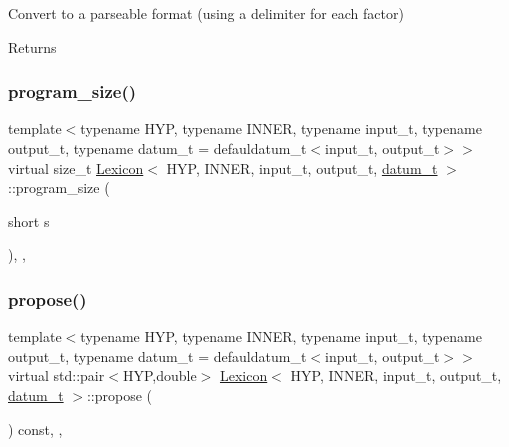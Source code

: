 Convert to a parseable format (using a delimiter for each factor) \begin{DoxyReturn}{Returns}

\end{DoxyReturn}
\mbox{\label{class_lexicon_a005225141f8a245fe33d8f0a58fd397a}} 
\subsubsection{\texorpdfstring{program\+\_\+size()}{program\_size()}}
{\footnotesize\ttfamily template$<$typename H\+YP, typename I\+N\+N\+ER, typename input\+\_\+t, typename output\+\_\+t, typename datum\+\_\+t = defauldatum\+\_\+t$<$input\+\_\+t, output\+\_\+t$>$$>$ \\
virtual size\+\_\+t \hyperlink{class_lexicon}{Lexicon}$<$ H\+YP, I\+N\+N\+ER, input\+\_\+t, output\+\_\+t, \hyperlink{class_bayesable_a9f1a6c0cd7855550fa10b1a8f13a5867}{datum\+\_\+t} $>$\+::program\+\_\+size (\begin{DoxyParamCaption}\item[{short}]{s }\end{DoxyParamCaption})\hspace{0.3cm}{\ttfamily [inline]}, {\ttfamily [override]}, {\ttfamily [virtual]}}

\mbox{\label{class_lexicon_afa8ea51bbd16df5f46557fe10db84980}} 
\subsubsection{\texorpdfstring{propose()}{propose()}}
{\footnotesize\ttfamily template$<$typename H\+YP, typename I\+N\+N\+ER, typename input\+\_\+t, typename output\+\_\+t, typename datum\+\_\+t = defauldatum\+\_\+t$<$input\+\_\+t, output\+\_\+t$>$$>$ \\
virtual std\+::pair$<$H\+YP,double$>$ \hyperlink{class_lexicon}{Lexicon}$<$ H\+YP, I\+N\+N\+ER, input\+\_\+t, output\+\_\+t, \hyperlink{class_bayesable_a9f1a6c0cd7855550fa10b1a8f13a5867}{datum\+\_\+t} $>$\+::propose (\begin{DoxyParamCaption}{ }\end{DoxyParamCaption}) const\hspace{0.3cm}{\ttfamily [inline]}, {\ttfamily [override]}, {\ttfamily [virtual]}}

